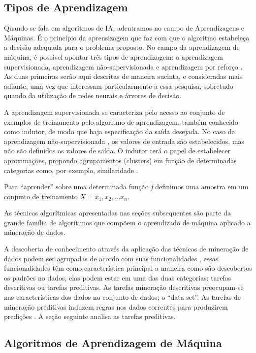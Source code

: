 \subsection{Tipos de Aprendizagem}

Quando se fala em algoritmos de IA, adentramos no campo de Aprendizagens e Máquinas. É o princípio da aprensizagem que faz com que o algoritmo estabeleça a decisão adequada para o problema proposto.
No campo da aprendizagem de máquina, é possível apontar três tipos de aprendizagem: a aprendizagem supervisionada, aprendizagem não-supervisionada e aprendizagem por reforço \cite{NorvigRussel2004}. As duas primeiras serão aqui descritas de maneira sucinta, e consideradas mais adiante, uma vez que interessam particularmente a essa pesquisa, sobretudo quando da utilização de redes neurais e árvores de decisão. 

A aprendizagem supervisionada \cite{Monard} se caracteriza pelo acesso ao conjunto de exemplos de treinamento pelo algoritmo de aprendizagem, também conhecido como indutor, de modo que haja especificação da saída desejada.
No caso da aprendizagem não-supervisionada \cite{NorvigRussel2004}, os valores de entrada são estabelecidos, mas não são definidos os valores de saída. O indutor terá o papel de estabelecer aproximações, propondo agrupamentos (clusters) em função de determinadas categorias como, por exemplo, similaridade \cite{Monard}.

Para ``aprender'' sobre uma determinada função \textit{f} definimos uma amostra em um conjunto de treinamento $X = {x_{1}, x_{2}, ...x_{n}}$.

As técnicas algorítmicas apresentadas nas seções subsequentes são parte da grande família de algorítimos que compõem 
o aprendizado de máquina aplicado a mineração de dados.

A descoberta de conhecimento através da aplicação das técnicas de mineração de dados podem ser agrupadas de acordo com suas funcionalidades \cite{DataMining2}, 
essas funcionalidades têm como característica principal a maneira como são descobertos os padrões no dados, elas podem estar 
em uma das duas categorias: tarefas descritivas ou tarefas preditivas. As tarefas mineração descritivas preocupam-se nas características 
dos dados no conjunto de dados; o ``data set''. As tarefas de mineração preditivas induzem regras nos dados correntes para produzirem 
predições \cite{DataMining2}. A seção seguinte analisa as tarefas preditivas.



\subsection{Algoritmos de Aprendizagem de Máquina}

